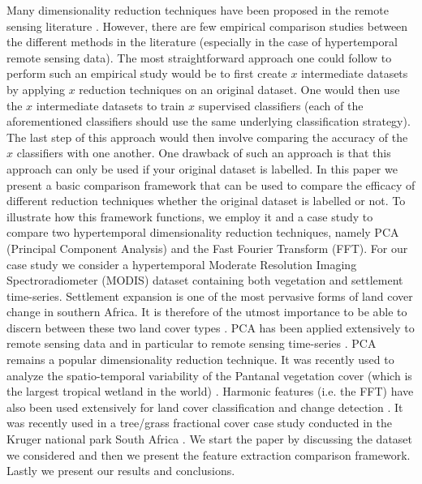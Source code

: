 \documentclass{article}
\begin{document}
Many dimensionality reduction techniques have been proposed in the remote sensing literature \cite{grobler2012}. However, there are few empirical comparison studies between the different methods
in the literature (especially in the case of hypertemporal remote sensing data). The most straightforward approach one could follow to perform such an empirical 
study would be to first create $x$ intermediate datasets by applying $x$ reduction techniques on an original dataset. One would then use the $x$ intermediate 
datasets to train $x$ supervised classifiers (each of the aforementioned classifiers should use the same underlying classification strategy). The last step of this approach would then 
involve comparing the accuracy of the $x$ classifiers with one another. One drawback of such an approach is that this approach can only be used if your original dataset is 
labelled. In this paper we present a basic comparison framework that can be used to compare the 
efficacy of different reduction techniques whether the original dataset is labelled or not. To illustrate how this framework functions, we employ it and a case study to compare two hypertemporal 
dimensionality reduction techniques, namely PCA (Principal Component Analysis) and the Fast Fourier Transform (FFT). For our case study we consider a hypertemporal Moderate Resolution Imaging Spectroradiometer (MODIS) dataset containing both vegetation and settlement time-series.
Settlement expansion is one of the most pervasive forms of land cover change in southern Africa. It is therefore of the utmost importance to be able to discern 
between these two land cover types \cite{grobler2012}. PCA has been applied extensively to remote sensing data \cite{byrne1980} and in particular to remote sensing time-series \cite{hall2003}. PCA remains a popular dimensionality reduction technique. It was recently used to analyze the spatio-temporal variability of 
the Pantanal vegetation cover (which is the largest tropical wetland in the world) \cite{almeida2015}.  %
Harmonic features (i.e. the FFT) have also been used extensively for land cover classification and change detection \cite{jakubauskas2002}. It was recently used in a tree/grass fractional cover case study conducted in 
the Kruger national park South Africa \cite{ibrahim2018}. We start the paper by discussing the dataset we considered and then we present the feature extraction comparison framework. Lastly we present our results and conclusions.
\end{document}
